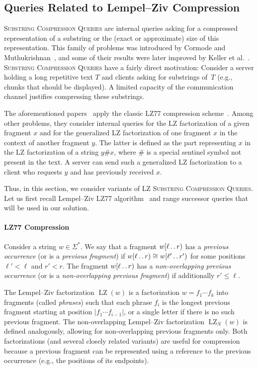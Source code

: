 \documentclass[a4paper]{article}
\theoremstyle{definition}
\theoremstyle{remark}
\newcommand{\LSC}{\textsc{LZ Substring Compression Queries}\xspace}
\newcommand{\LZ}{\operatorname{LZ}}
\newcommand{\dd}{\mathinner{\ldotp\ldotp}}
\begin{document}
\thmfc*

\subsection{Queries Related to Lempel--Ziv Compression}\label{sec:GSC}
\textsc{Substring Compression Queries} are internal queries asking for a compressed representation of a substring or the (exact or approximate) size of this representation.
This family of problems was introduced by Cormode and Muthukrishnan~\cite{DBLP:conf/soda/CormodeM05},
and some of their results were later improved by Keller et al.~\cite{DBLP:journals/tcs/KellerKFL14}.
\textsc{Substring Compression Queries} have a fairly direct motivation: 
Consider a server holding a long repetitive text $T$ and clients asking for substrings of~$T$ (e.g., chunks that should be displayed).
A limited capacity of the communication channel justifies compressing these substrings.

The aforementioned papers~\cite{DBLP:conf/soda/CormodeM05,DBLP:journals/tcs/KellerKFL14} apply the classic LZ77 compression scheme~\cite{DBLP:journals/tit/ZivL77}.
Among other problems, they consider internal queries for the LZ factorization of a given fragment $x$
and for the generalized LZ factorization of one fragment $x$ in the context of another fragment $y$.
The latter is defined as the part representing $x$ in the LZ factorization of a string $y\# x$, 
where $\#$ is a special sentinel symbol not present in the text. 
A server can send such a generalized LZ factorization to a client who requests $y$ and has previously received $x$.

Thus, in this section, we consider variants of \LSC.
Let us first recall Lempel--Ziv LZ77 algorithm~\cite{DBLP:journals/tit/ZivL77} and range successor queries that will be used in our solution.

\paragraph{LZ77 Compression}
Consider a string $w\in \Sigma^*$. We say that a fragment $w[\ell\dd r)$ has a \emph{previous occurrence} (or is a \emph{previous fragment}) if $w[\ell\dd r)\cong w[\ell'\dd r')$ for some positions $\ell'<\ell$ and $r'<r$. The fragment $w[\ell\dd r)$ has a \emph{non-overlapping previous occurrence} (or is a \emph{non-overlapping previous fragment}) if additionally $r'\le \ell$.

The Lempel--Ziv factorization $\LZ(w)$ is a factorization $w=f_1 \cdots f_k$ into fragments (called \emph{phrases}) such that 
each phrase $f_i$ is the longest previous fragment starting at position $|f_1\cdots f_{i-1}|$,
or a single letter if there is no such previous fragment.
The non-overlapping Lempel--Ziv factorization $\LZ_N(w)$ is defined analogously, allowing for non-overlapping previous fragments only.
Both factorizations (and several closely related variants) are useful for compression
because a previous fragment can be represented using a reference to the previous occurrence (e.g., the positions of its endpoints).
\end{document}
